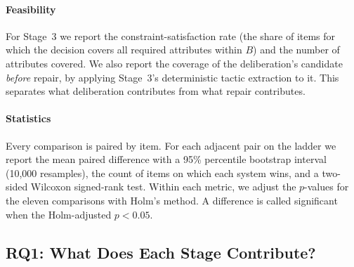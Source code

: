 \documentclass[preprint,12pt,authoryear]{elsarticle}
\renewcommand{\_}{\textunderscore\allowbreak{}}
\begin{document}
\paragraph{Feasibility} For Stage~3 we report the constraint-satisfaction rate (the share of items for which the decision covers all required attributes within $B$) and the number of attributes covered. We also report the coverage of the deliberation's candidate \emph{before} repair, by applying Stage~3's deterministic tactic extraction to it. This separates what deliberation contributes from what repair contributes.

\paragraph{Statistics} Every comparison is paired by item. For each adjacent pair on the ladder we report the mean paired difference with a 95\% percentile bootstrap interval (10{,}000 resamples), the count of items on which each system wins, and a two-sided Wilcoxon signed-rank test. Within each metric, we adjust the $p$-values for the eleven comparisons with Holm's method. A difference is called significant when the Holm-adjusted $p<0.05$.

\subsection{RQ1: What Does Each Stage Contribute?}
\label{sec:rq1}
\end{document}

